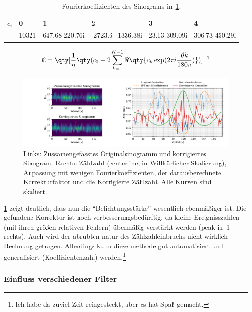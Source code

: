 \documentclass[slug=PET, room=Andreas-Schubert-Bau\,\ 424A, supervisor=Carsten\ Bittrich, coursedate=10.\ 01.\ 2020]{../../Lab_Report_LaTeX/lab_report}
\begin{document}
\begin{table}[h]
  \centering
  \begin{tabular}{l|lllll}
    \toprule
    \(c_i\) & 0 & 1 & 2 & 3 & 4 \\
    \midrule
            & 10321 & 647.68-220.76i & -2723.6+1336.38i & 23.13-309.09i & 306.73-450.29i
  \end{tabular}
  \caption{Fourierkoeffizienten des Sinograms in~\ref{fig:tom2-raw_and_corrected}.}
  \label{tab:coeff}
\end{table}

\begin{equation}
  \label{eq:correction}
  \mathfrak{C} = \qty[\frac{1}{n}
  \qty(c_0 + 2\sum_{k=1}^{K-1}{\Re\qty{c_k\exp(2\pi i \frac{\theta k}{180 n})}})]^{-1}
\end{equation}

\begin{figure}[h]
  \centering
  \includegraphics[width=\textwidth]{../auswertung/figs/tom2/raw_and_corrected.pdf}
  \caption[Sinogramme und Korrekturfunktion]{Links: Zussamengefasstes
    Originalsinogramm und korrigiertes Sinogram. Rechts: Z\"ahlzahl
    (centerline, in Willk\"urlicher Skalierung), Anpassung mit wenigen
  Fourierkoeffizienten, der darausberechnete Korrekturfaktor und die
  Korrigierte Z\"ahlzahl. Alle Kurven sind skaliert.}
  \label{fig:tom2-raw_and_corrected}
\end{figure}

\ref{fig:tom2-raw_and_corrected} zeigt deutlich, dass nun die
``Belichtungsst\"arke'' wesentlich ebenm\"a\ss{}iger ist. Die
gefundene Korrektur ist noch verbesserungsbed\"urftig, da kleine
Ereignisszahlen (mit ihren gr\"o\ss{}en relativen Fehlern)
\"uberm\"a\ss{}ig verst\"arkt werden (peak
in~\ref{fig:tom2-raw_and_corrected} rechts). Auch wird der abrubten
natur des Z\"ahlzahleinbruchs nicht wirklich Rechnung
getragen. Allerdings kann diese methode gut automatisiert und
generalisiert (Koeffizientenzahl) werden.\footnote{Ich habe da zuviel
  Zeit reingesteckt, aber es hat Spa\ss{} gemacht.}

\subsubsection{Einfluss verschiedener Filter}
\label{sec:filter}
\end{document}
